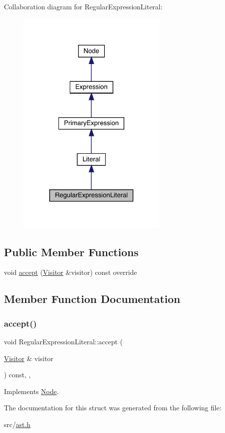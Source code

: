 Collaboration diagram for Regular\+Expression\+Literal\+:\nopagebreak
\begin{figure}[H]
\begin{center}
\leavevmode
\includegraphics[width=208pt]{struct_regular_expression_literal__coll__graph}
\end{center}
\end{figure}
\subsection*{Public Member Functions}
\begin{DoxyCompactItemize}
\item 
void \hyperlink{struct_regular_expression_literal_a0df8cb8e68e12de1751821c9a1c60617}{accept} (\hyperlink{struct_visitor}{Visitor} \&visitor) const override
\end{DoxyCompactItemize}


\subsection{Member Function Documentation}
\mbox{\label{struct_regular_expression_literal_a0df8cb8e68e12de1751821c9a1c60617}} 
\subsubsection{\texorpdfstring{accept()}{accept()}}
{\footnotesize\ttfamily void Regular\+Expression\+Literal\+::accept (\begin{DoxyParamCaption}\item[{\hyperlink{struct_visitor}{Visitor} \&}]{visitor }\end{DoxyParamCaption}) const\hspace{0.3cm}{\ttfamily [inline]}, {\ttfamily [override]}, {\ttfamily [virtual]}}



Implements \hyperlink{struct_node_a10bd7af968140bbf5fa461298a969c71}{Node}.



The documentation for this struct was generated from the following file\+:\begin{DoxyCompactItemize}
\item 
src/\hyperlink{ast_8h}{ast.\+h}\end{DoxyCompactItemize}

